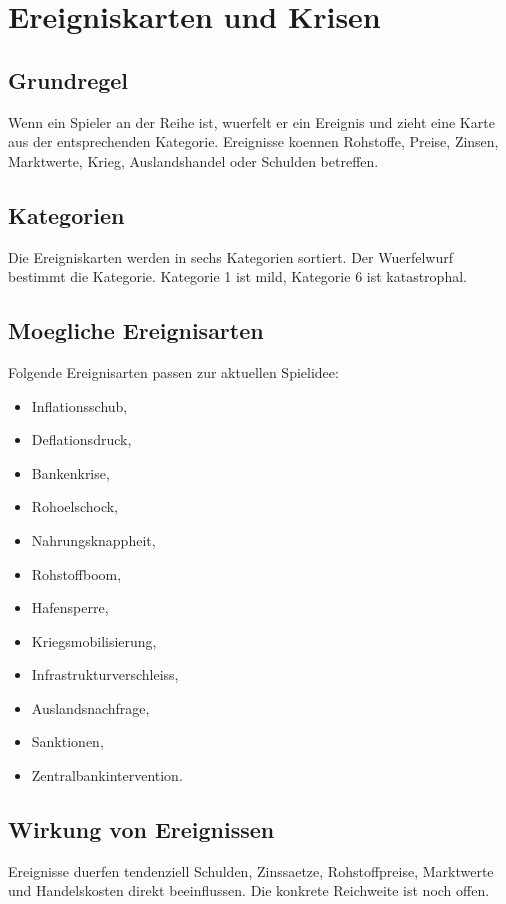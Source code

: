 \documentclass[11pt,a4paper,oneside,parskip=half]{scrreprt}
\begin{document}
\chapter{Ereigniskarten und Krisen}

\section{Grundregel}
Wenn ein Spieler an der Reihe ist, wuerfelt er ein Ereignis und zieht eine Karte aus der entsprechenden Kategorie. Ereignisse koennen Rohstoffe, Preise, Zinsen, Marktwerte, Krieg, Auslandshandel oder Schulden betreffen.

\section{Kategorien}
Die Ereigniskarten werden in sechs Kategorien sortiert. Der Wuerfelwurf bestimmt die Kategorie. Kategorie 1 ist mild, Kategorie 6 ist katastrophal.

\section{Moegliche Ereignisarten}
Folgende Ereignisarten passen zur aktuellen Spielidee:
\begin{itemize}
  \item Inflationsschub,
  \item Deflationsdruck,
  \item Bankenkrise,
  \item Rohoelschock,
  \item Nahrungsknappheit,
  \item Rohstoffboom,
  \item Hafensperre,
  \item Kriegsmobilisierung,
  \item Infrastrukturverschleiss,
  \item Auslandsnachfrage,
  \item Sanktionen,
  \item Zentralbankintervention.
\end{itemize}

\section{Wirkung von Ereignissen}
Ereignisse duerfen tendenziell Schulden, Zinssaetze, Rohstoffpreise, Marktwerte und Handelskosten direkt beeinflussen. Die konkrete Reichweite ist noch offen.
\end{document}
